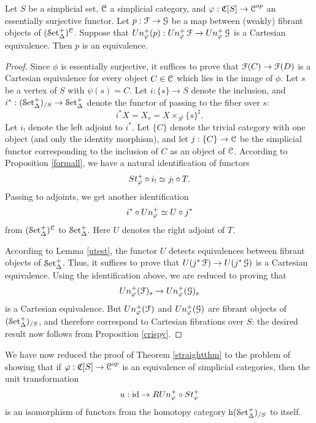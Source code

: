\begin{lemma}\label{garbz}
Let $S$ be a simplicial set, $\operatorname{\mathcal{C}}$ a simplicial category, and $\varphi: \operatorname{\mathfrak{C}}[S] \rightarrow \operatorname{\mathcal{C}}^{op}$ an essentially surjective functor. Let $p: \operatorname{\mathcal{F}} \rightarrow \operatorname{\mathcal{G}}$ be a map between (weakly) fibrant objects
of $(\operatorname{\mathcal{S}et_{\Delta}^{+}})^{\operatorname{\mathcal{C}}}$. Suppose that $Un^{+}_{\varphi}(p): Un^{+}_{\varphi} \operatorname{\mathcal{F}} \rightarrow Un^{+}_{\varphi} \operatorname{\mathcal{G}}$ is a Cartesian equivalence. Then $p$ is an equivalence.
\end{lemma}

\begin{proof}
Since $\phi$ is essentially surjective, it suffices to prove that $\operatorname{\mathcal{F}}(C) \rightarrow \operatorname{\mathcal{F}}(D)$
is a Cartesian equivalence for every object $C \in \operatorname{\mathcal{C}}$ which lies in the image of $\phi$. 
Let $s$ be a vertex of $S$ with $\psi(s) = C$. Let $i: \{s\} \rightarrow S$ denote the inclusion, and
$i^{\ast}: (\operatorname{\mathcal{S}et_{\Delta}^{+}})_{/S} \rightarrow \operatorname{\mathcal{S}et_{\Delta}^{+}}$ denote the functor of passing to the fiber over $s$:
$$ i^{\ast} X = X_{s} = X \times_{ S^{\sharp} } \{s\}^{\sharp}.$$
Let $i_{!}$ denote the left adjoint to $i^{\ast}$. Let $\{C\}$ denote the trivial
category with one object (and only the identity morphism), and let $j: \{C\} \rightarrow \operatorname{\mathcal{C}}$ be the simplicial functor corresponding to the inclusion of $C$ as an object of $\operatorname{\mathcal{C}}$. According to Proposition \ref{formall}, we have a natural identification of functors
$$ St^{+}_{\varphi} \circ i_{!} \simeq j_{!} \circ T.$$
Passing to adjoints, we get another identification
$$ i^{\ast} \circ Un^{+}_{\varphi} \simeq U \circ j^{\ast}$$
from $(\operatorname{\mathcal{S}et_{\Delta}^{+}})^{\operatorname{\mathcal{C}}}$ to $\operatorname{\mathcal{S}et_{\Delta}^{+}}$. Here $U$ denotes the right adjoint of $T$.

According to Lemma \ref{utest}, the functor $U$ detects equivalences between fibrant objects
of $\operatorname{\mathcal{S}et_{\Delta}^{+}}$. Thus, it suffices to prove that $U( j^{\ast} \operatorname{\mathcal{F}}) \rightarrow U( j^{\ast} \operatorname{\mathcal{G}})$ is a Cartesian equivalence. Using the identification above, we are reduced to proving that
$$ Un^{+}_{\varphi}(\operatorname{\mathcal{F}})_{s} \rightarrow Un^{+}_{\varphi}(\operatorname{\mathcal{G}})_{s}$$ is a Cartesian equivalence.
But $Un^{+}_{\varphi}(\operatorname{\mathcal{F}})$ and $Un^{+}_{\varphi}(\operatorname{\mathcal{G}})$ are fibrant objects of $(\operatorname{\mathcal{S}et_{\Delta}^{+}})_{/S}$, and therefore correspond to Cartesian fibrations over $S$: the desired result now follows from
Proposition \ref{crispy}.
\end{proof}

We have now reduced the proof of Theorem \ref{straightthm} to the problem of showing that
if $\varphi: \operatorname{\mathfrak{C}}[S] \rightarrow \operatorname{\mathcal{C}}^{op}$ is an equivalence of simplicial categories, then
the unit transformation
$$ u: \operatorname{id} \rightarrow R Un^{+}_{\varphi} \circ St^{+}_{\varphi}$$
is an isomorphism of functors from the homotopy category $\rm{h} \it{(\operatorname{\mathcal{S}et_{\Delta}^{+}})_{/S}}$ to itself. 


